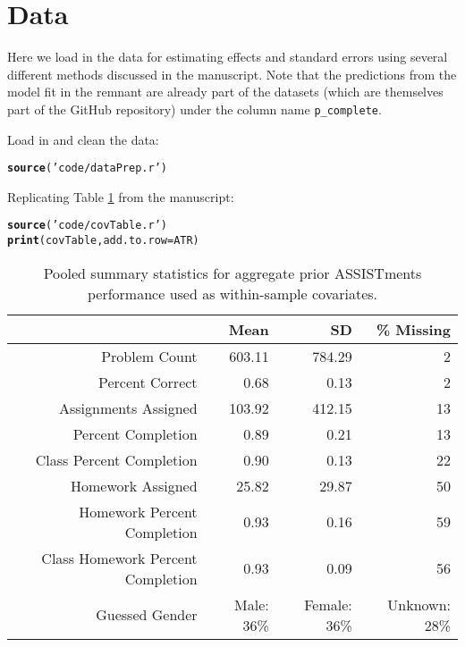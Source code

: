 \documentclass[12pt]{article}\usepackage[]{graphicx}\usepackage[]{xcolor}
\makeatletter
\newcommand{\hlstr}[1]{\textcolor[rgb]{0.192,0.494,0.8}{#1}}%
\newcommand{\hlstd}[1]{\textcolor[rgb]{0.345,0.345,0.345}{#1}}%
\newcommand{\hlkwc}[1]{\textcolor[rgb]{0.333,0.667,0.333}{#1}}%
\newcommand{\hlkwd}[1]{\textcolor[rgb]{0.737,0.353,0.396}{\textbf{#1}}}%
\newenvironment{kframe}{%
 \def\at@end@of@kframe{}%
 \ifinner\ifhmode%
  \def\at@end@of@kframe{\end{minipage}}%
  \begin{minipage}{\columnwidth}%
 \fi\fi%
 \def\FrameCommand##1{\hskip\@totalleftmargin \hskip-\fboxsep
 \colorbox{shadecolor}{##1}\hskip-\fboxsep
     \hskip-\linewidth \hskip-\@totalleftmargin \hskip\columnwidth}%
 \MakeFramed {\advance\hsize-\width
   \@totalleftmargin\z@ \linewidth\hsize
   \@setminipage}}%
 {\par\unskip\endMakeFramed%
 \at@end@of@kframe}
\newenvironment{knitrout}{}{} %
\makeatother
\begin{document}
\section{Data}

Here we load in the data for estimating effects and standard errors
using several different methods discussed in the manuscript.
Note that the predictions from the model fit in the remnant are
already part of the datasets (which are themselves part of the GitHub
repository) under the column name \texttt{p\_complete}.

Load in and clean the data:\\

\begin{knitrout}
\color{fgcolor}\begin{kframe}
\begin{alltt}
\hlkwd{source}\hlstd{(}\hlstr{'code/dataPrep.r'}\hlstd{)}
\end{alltt}
\end{kframe}
\end{knitrout}

Replicating Table \ref{tab:covariates} from the manuscript:

\begin{kframe}
\begin{alltt}
\hlkwd{source}\hlstd{(}\hlstr{'code/covTable.r'}\hlstd{)}
\hlkwd{print}\hlstd{(covTable,} \hlkwc{add.to.row}\hlstd{=ATR)}
\end{alltt}
\end{kframe}%
\begin{table}[ht]
\centering
\begin{tabular}{rrrr}
  \hline
 & Mean & SD & \% Missing \\ 
  \hline
Problem Count & 603.11 & 784.29 & 2 \\ 
  Percent Correct & 0.68 & 0.13 & 2 \\ 
  Assignments Assigned & 103.92 & 412.15 & 13 \\ 
  Percent Completion & 0.89 & 0.21 & 13 \\ 
  Class Percent Completion & 0.90 & 0.13 & 22 \\ 
  Homework Assigned & 25.82 & 29.87 & 50 \\ 
  Homework Percent Completion & 0.93 & 0.16 & 59 \\ 
  Class Homework Percent Completion & 0.93 & 0.09 & 56 \\ 
   Guessed Gender&Male: 36\%&Female: 36\%&Unknown: 28\%\\
 \hline
\end{tabular}
\caption{Pooled summary statistics for aggregate prior ASSISTments performance used as within-sample covariates.} 
\label{tab:covariates}
\end{table}
\end{document}
